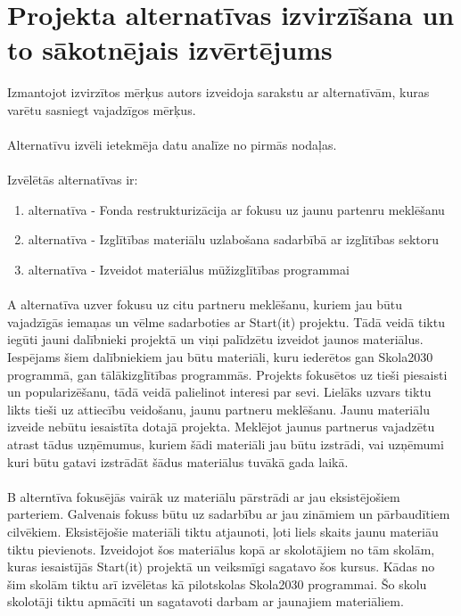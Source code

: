 \section{Projekta alternatīvas izvirzīšana un to sākotnējais izvērtējums}
Izmantojot izvirzītos mērķus autors izveidoja sarakstu ar alternatīvām, kuras varētu sasniegt vajadzīgos
mērķus.
\paragraph{}
Alternatīvu izvēli ietekmēja datu analīze no pirmās nodaļas.
\paragraph{}
Izvēlētās alternatīvas ir:
\renewcommand{\labelenumi}{\Alph{enumi}}
\begin{enumerate}
    \item alternatīva - Fonda restrukturizācija ar fokusu uz jaunu partenru meklēšanu
    \item alternatīva - Izglītības materiālu uzlabošana sadarbībā ar izglītības sektoru
    \item alternatīva - Izveidot materiālus mūžizglītības programmai
\end{enumerate}
\renewcommand{\labelenumi}{\arabic{enumi}}
\paragraph{}
A alternatīva uzver fokusu uz citu partneru meklēšanu, kuriem jau būtu vajadzīgās iemaņas un vēlme
sadarboties ar Start(it) projektu. Tādā veidā tiktu iegūti jauni dalībnieki projektā un viņi palīdzētu
izveidot jaunos materiālus. Iespējams šiem dalībniekiem jau būtu materiāli, kuru iederētos gan Skola2030
programmā, gan tālākizglītības programmās. Projekts fokusētos uz tieši piesaisti un popularizēšanu,
tādā veidā palielinot interesi par sevi. Lielāks uzvars tiktu likts tieši uz attiecību veidošanu, jaunu
partneru meklēšanu. Jaunu materiālu izveide nebūtu iesaistīta dotajā projekta. Meklējot jaunus partnerus
vajadzētu atrast tādus uzņēmumus, kuriem šādi materiāli jau būtu izstrādi, vai uzņēmumi kuri būtu gatavi
izstrādāt šādus materiālus tuvākā gada laikā.
\paragraph{}
B alterntīva fokusējās vairāk uz materiālu pārstrādi ar jau eksistējošiem parteriem. Galvenais fokuss būtu
uz sadarbību ar jau zināmiem un pārbaudītiem cilvēkiem. Eksistējošie materiāli tiktu atjaunoti, ļoti liels
skaits jaunu materiāu tiktu pievienots. Izveidojot šos materiālus kopā ar skolotājiem no tām skolām, kuras
iesaistījās Start(it) projektā un veiksmīgi sagatavo šos kursus. Kādas no šim skolām tiktu arī izvēlētas kā 
pilotskolas Skola2030 programmai. Šo skolu skolotāji tiktu apmācīti un sagatavoti darbam ar jaunajiem materiāliem.
